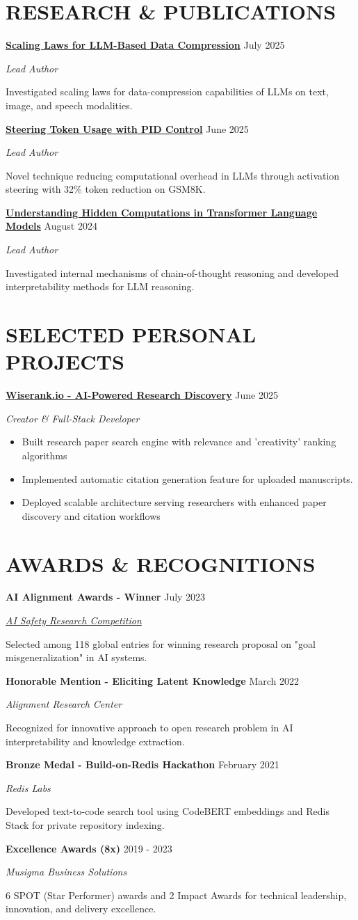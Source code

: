 \documentclass[fontsize=11pt]{article}
\newcommand{\NewPart}[1]{\section*{\uppercase{#1}}}
\newcommand{\ProjectEntry}[4]{
    \noindent \textbf{#1} \hfill {#2} \par
    \noindent \textit{#3} \par
    \noindent \small #4
    \normalsize \par}
\newcommand{\AwardEntry}[4]{
    \noindent \textbf{#1} \hfill {#2} \par
    \noindent \textit{#3} \par
    \noindent \small #4
    \normalsize \par}
\begin{document}
\NewPart{RESEARCH \& PUBLICATIONS}

\ProjectEntry{\href{https://fullwrong.com/2025/07/23/scaling-compression/}{Scaling Laws for LLM-Based Data Compression}}{July 2025}{Lead Author}
{Investigated scaling laws for data-compression capabilities of LLMs on text, image, and speech modalities.}

\ProjectEntry{\href{https://arxiv.org/abs/2506.18831}{Steering Token Usage with PID Control}}{June 2025}{Lead Author}
{Novel technique reducing computational overhead in LLMs through activation steering with 32\% token reduction on GSM8K.}

\ProjectEntry{\href{https://arxiv.org/html/2412.04537}{Understanding Hidden Computations in Transformer Language Models}}{August 2024}{Lead Author}
{Investigated internal mechanisms of chain-of-thought reasoning and developed interpretability methods for LLM reasoning.}

\NewPart{SELECTED PERSONAL PROJECTS}
\ProjectEntry{\href{https://wiserank.io}{Wiserank.io - AI-Powered Research Discovery}}{June 2025}{Creator \& Full-Stack Developer}
{%
\begin{itemize}
\item Built research paper search engine with relevance and 'creativity' ranking algorithms
\item Implemented automatic citation generation feature for uploaded manuscripts.
\item Deployed scalable architecture serving researchers with enhanced paper discovery and citation workflows
\end{itemize}}

\NewPart{AWARDS \& RECOGNITIONS}

\AwardEntry{AI Alignment Awards - Winner}{July 2023}{\href{https://www.lesswrong.com/posts/zFoAAD7dfWdczxoLH/winners-of-ai-alignment-awards-research-contest}{AI Safety Research Competition}}
{Selected among 118 global entries for winning research proposal on "goal misgeneralization" in AI systems.}

\AwardEntry{Honorable Mention - Eliciting Latent Knowledge}{March 2022}{Alignment Research Center}
{Recognized for innovative approach to open research problem in AI interpretability and knowledge extraction.}

\AwardEntry{Bronze Medal - Build-on-Redis Hackathon}{February 2021}{Redis Labs}
{Developed text-to-code search tool using CodeBERT embeddings and Redis Stack for private repository indexing.}

\AwardEntry{Excellence Awards (8x)}{2019 - 2023}{Musigma Business Solutions}
{6 SPOT (Star Performer) awards and 2 Impact Awards for technical leadership, innovation, and delivery excellence.}
\end{document}
